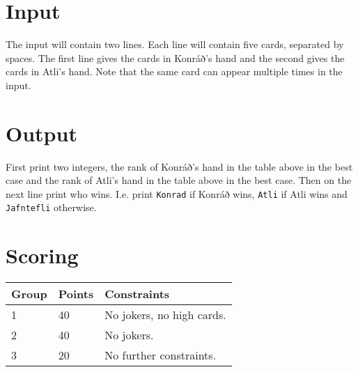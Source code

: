 \section*{Input}
The input will contain two lines. Each line will contain five cards, separated by spaces. 
The first line gives the cards in Konráð's hand and the second gives the cards in Atli's hand.
Note that the same card can appear multiple times in the input.

\section*{Output}
First print two integers, 
the rank of Konráð's hand in the table above in the best case and the rank of Atli's hand in the table above in the best case.
Then on the next line print who wins.
I.e. print \texttt{Konrad} if Konráð wins, \texttt{Atli} if Atli wins and \texttt{Jafntefli} otherwise.

\section*{Scoring}
\begin{tabular}{|l|l|l|}
\hline
Group & Points & Constraints \\ \hline
1     & 40   & No jokers, no high cards. \\ \hline
2     & 40   & No jokers. \\ \hline
3     & 20   & No further constraints. \\ \hline
\end{tabular}

